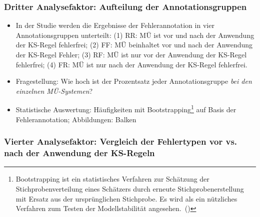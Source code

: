 \subsubsection*{Dritter Analysefaktor: Aufteilung der Annotationsgruppen}

\begin{itemize}
\item In der Studie werden die Ergebnisse der Fehlerannotation in vier Annotationsgruppen unterteilt:
(1) RR: MÜ ist vor und nach der Anwendung der KS-Regel fehlerfrei; (2) FF: MÜ beinhaltet vor und nach der Anwendung der KS-Regel Fehler; (3) RF: MÜ ist nur vor der Anwendung der KS-Regel fehlerfrei; (4) FR: MÜ ist nur nach der Anwendung der KS-Regel fehlerfrei.

\item Fragestellung: Wie hoch ist der Prozentsatz jeder Annotationsgruppe \textit{bei den einzelnen MÜ-Systemen}?

\item Statistische Auswertung: Häufigkeiten mit Bootstrapping\footnote{{{{Bootstrapping ist ein statistisches Verfahren zur Schätzung der Stichprobenverteilung eines Schätzers durch erneute Stichprobenerstellung mit Ersatz aus der ursprünglichen Stichprobe. Es wird als ein nützliches Verfahren zum Testen der Modellstabilität angesehen.~(\citealt{IBMnodate})}}}} auf Basis der Fehlerannotation; Abbildungen: Balken

\end{itemize}

\subsubsection*{Vierter Analysefaktor: Vergleich der Fehlertypen vor vs. nach der Anwendung der KS-Regeln}

